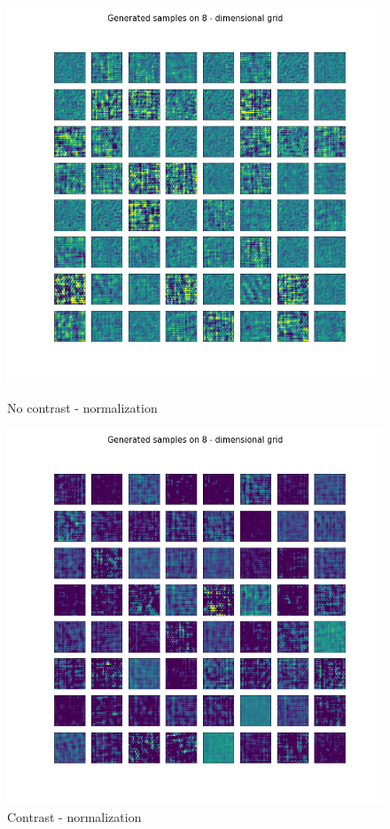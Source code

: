 \documentclass[12pt, english]{article}
\begin{document}
\begin{figure}[H]
\begin{minipage}[b]{0.5\linewidth}
    \centering
    \includegraphics[width=.75\linewidth]{contrast/generated_samples_contrastNorm_noContrast.png} 
    \caption{No contrast - normalization} 
    \label{fig:contrast-generated-3} 
  \end{minipage}%
  \begin{minipage}[b]{0.5\linewidth}
    \centering
    \includegraphics[width=.75\linewidth]{contrast/generated_samples_contrastNorm_contrast.png} 
    \caption{Contrast - normalization} 
    \label{fig:contrast-generated-4} 
  \end{minipage} 
\end{figure}

\vspace{4mm}
\end{document}
